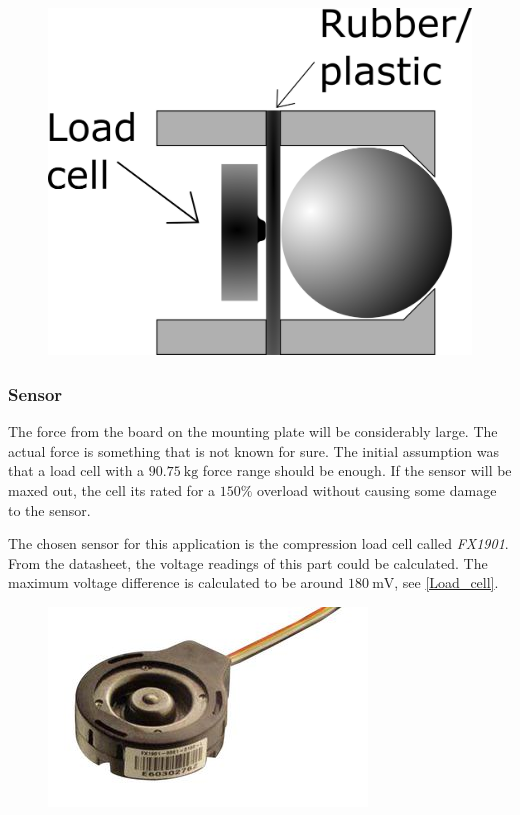 \begin{figure}[H]
\begin{center}
	\includegraphics[width = .45\textwidth]{Figures/Press_sens_func_2.png}
	\label{Press_sens_prot_2}
\end{center}
\end{figure}



\subsubsection{Sensor}
The force from the board on the mounting plate will be considerably large. The actual force is something that is not known for sure. The initial assumption was that a load cell with a $90.75~\textrm{kg}$ force range should be enough. If the sensor will be maxed out, the cell its rated for a $150\%$ overload without causing some damage to the sensor. 

The chosen sensor for this application is the compression load cell called \emph{FX1901}. 
From the datasheet\cite{load_cell}, the voltage readings of this part could be calculated. The maximum voltage difference is calculated to be around $180~\textrm{mV}$, see \autoref{Load_cell}.
\begin{figure}[H]
\begin{center}
	\includegraphics[width = .45\textwidth]{Figures/Load_cell.png}
	\label{Load_cell}
\end{center}
\end{figure}


